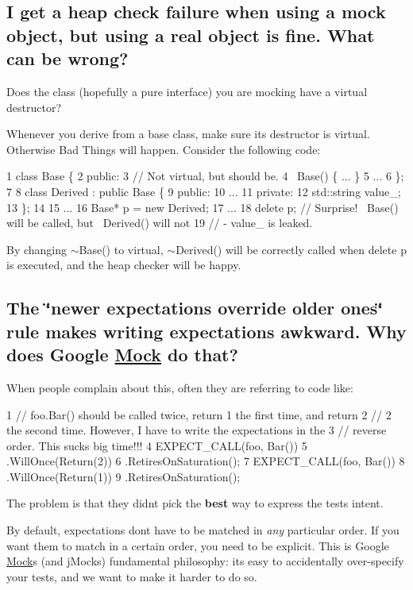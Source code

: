 \subsection*{I get a heap check failure when using a mock object, but using a real object is fine. What can be wrong?}

Does the class (hopefully a pure interface) you are mocking have a virtual destructor?

Whenever you derive from a base class, make sure its destructor is virtual. Otherwise Bad Things will happen. Consider the following code\+:


\begin{DoxyCode}
1 class Base \{
2  public:
3   // Not virtual, but should be.
4   ~Base() \{ ... \}
5   ...
6 \};
7 
8 class Derived : public Base \{
9  public:
10   ...
11  private:
12   std::string value\_;
13 \};
14 
15 ...
16   Base* p = new Derived;
17   ...
18   delete p;  // Surprise! ~Base() will be called, but ~Derived() will not
19              // - value\_ is leaked.
\end{DoxyCode}


By changing {\ttfamily $\sim$\+Base()} to virtual, {\ttfamily $\sim$\+Derived()} will be correctly called when {\ttfamily delete p} is executed, and the heap checker will be happy.

\subsection*{The \char`\"{}newer expectations override older ones\char`\"{} rule makes writing expectations awkward. Why does Google \hyperlink{class_mock}{Mock} do that?}

When people complain about this, often they are referring to code like\+:


\begin{DoxyCode}
1 // foo.Bar() should be called twice, return 1 the first time, and return
2 // 2 the second time.  However, I have to write the expectations in the
3 // reverse order.  This sucks big time!!!
4 EXPECT\_CALL(foo, Bar())
5     .WillOnce(Return(2))
6     .RetiresOnSaturation();
7 EXPECT\_CALL(foo, Bar())
8     .WillOnce(Return(1))
9     .RetiresOnSaturation();
\end{DoxyCode}


The problem is that they didn\textquotesingle{}t pick the {\bfseries best} way to express the test\textquotesingle{}s intent.

By default, expectations don\textquotesingle{}t have to be matched in {\itshape any} particular order. If you want them to match in a certain order, you need to be explicit. This is Google \hyperlink{class_mock}{Mock}\textquotesingle{}s (and j\+Mock\textquotesingle{}s) fundamental philosophy\+: it\textquotesingle{}s easy to accidentally over-\/specify your tests, and we want to make it harder to do so.

